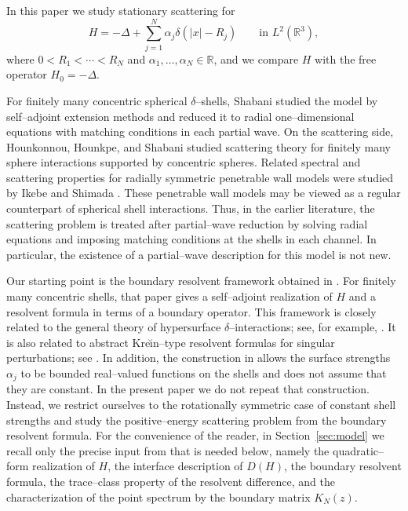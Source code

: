 \documentclass[a4paper,11pt]{article}
\numberwithin{equation}{section}
\newcommand{\R}{\mathbb{R}}
\theoremstyle{definition}
\theoremstyle{remark}
\begin{document}
In this paper we study stationary scattering for
\begin{equation}\label{eq:intro-H}
H
=
-\Delta+\sum_{j=1}^N \alpha_j\delta(|x|-R_j)
\qquad \text{in } L^2(\R^3),
\end{equation}
where $0<R_1<\cdots<R_N$ and
$\alpha_1,\ldots,\alpha_N\in\R$, and we compare $H$ with the free operator
$H_0=-\Delta$.

For finitely many concentric spherical $\delta$--shells, Shabani
\cite{Shabani1988} studied the model by self--adjoint extension methods and
reduced it to radial one--dimensional equations with matching conditions in
each partial wave. On the scattering side, Hounkonnou, Hounkpe, and Shabani
\cite{HounkonnouHounkpeShabani1997} studied scattering theory for finitely
many sphere interactions supported by concentric spheres. Related spectral
and scattering properties for radially symmetric penetrable wall models were
studied by Ikebe and Shimada \cite{IkebeShimada1991}. These penetrable wall
models may be viewed as a regular counterpart of spherical shell
interactions. 
Thus, in the earlier literature, the scattering problem is
treated after partial--wave reduction by solving radial equations and
imposing matching conditions at the shells in each channel. 
In particular, the existence of a partial--wave description for this model is not new.

Our starting point is the boundary resolvent framework obtained in \cite{KaminagaAAMP2026}. 
For finitely many concentric shells, that paper
gives a self--adjoint realization of $H$ and a resolvent formula in terms of
a boundary operator. This framework is closely related to the general theory
of hypersurface $\delta$--interactions; see, for example,
\cite{BehrndtLangerLotoreichik2013}. It is also related to abstract
Kre\u{\i}n--type resolvent formulas for singular perturbations; see
\cite{Posilicano2001}. 
In addition, the construction in
\cite{KaminagaAAMP2026} allows the surface strengths $\alpha_j$ to be bounded
real--valued functions on the shells and does not assume that they are constant. 
In the present paper we do not repeat that construction. Instead,
we restrict ourselves to the rotationally symmetric case of constant shell
strengths and study the positive--energy scattering problem from the boundary
resolvent formula. For the convenience of the reader, in
Section~\ref{sec:model} we recall only the precise input from
\cite{KaminagaAAMP2026} that is needed below, namely the quadratic--form
realization of $H$, the interface description of $D(H)$, the boundary
resolvent formula, the trace--class property of the resolvent difference, and
the characterization of the point spectrum by the boundary matrix $K_N(z)$.
\end{document}
